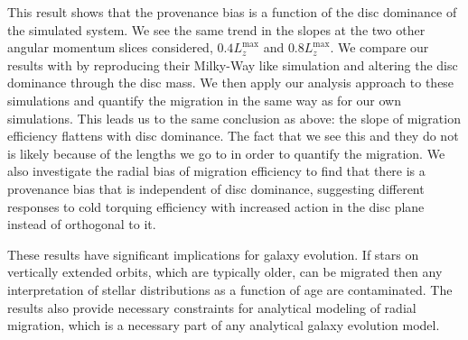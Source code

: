 This result shows that the provenance bias is a function of the disc dominance of the simulated system. We see the same trend in the slopes at the two other angular momentum slices considered, $0.4 L_z^\mathrm{max}$ and $0.8 L_z^\mathrm{max}$. We compare our results with \cite{vera-ciro:16b} by reproducing their Milky-Way like simulation and altering the disc dominance through the disc mass. We then apply our analysis approach to these simulations and quantify the migration in the same way as for our own simulations. This leads us to the same conclusion as above: the slope of migration efficiency flattens with disc dominance. The fact that we see this and they do not is likely because of the lengths we go to in order to quantify the migration. We also investigate the radial bias of migration efficiency to find that there is a provenance bias that is independent of disc dominance, suggesting different responses to cold torquing efficiency with increased action in the disc plane instead of orthogonal to it.

These results have significant implications for galaxy evolution. If stars on vertically extended orbits, which are typically older, can be migrated then any interpretation of stellar distributions as a function of age are contaminated. The results also provide necessary constraints for analytical modeling of radial migration, which is a necessary part of any analytical galaxy evolution model.
